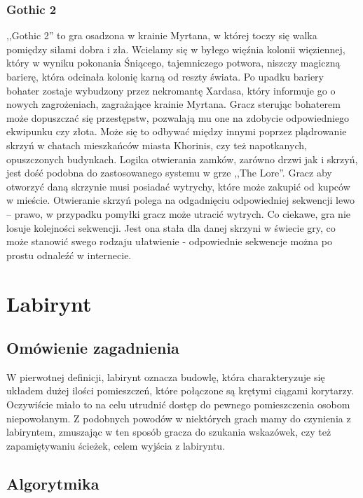\documentclass[oneside,polski,logo]{amuthesis}
\begin{document}
\subsubsection{Gothic 2}
\par ,,Gothic 2'' to gra osadzona w krainie Myrtana, w której toczy się walka pomiędzy siłami dobra i zła. Wcielamy się w byłego więźnia kolonii więziennej, który w wyniku pokonania Śniącego, tajemniczego potwora, niszczy magiczną barierę, która odcinała kolonię karną od reszty świata. Po upadku bariery bohater zostaje wybudzony przez nekromantę Xardasa, który informuje go o nowych zagrożeniach, zagrażające krainie Myrtana. Gracz sterując bohaterem może dopuszczać się przestępstw, pozwalają mu one na zdobycie odpowiedniego ekwipunku czy złota. Może się to odbywać między innymi poprzez plądrowanie skrzyń w chatach mieszkańców miasta Khorinis, czy też napotkanych, opuszczonych budynkach. 
Logika otwierania zamków, zarówno drzwi jak i skrzyń, jest dość podobna do zastosowanego systemu w grze ,,The Lore''. Gracz aby otworzyć daną skrzynie musi posiadać wytrychy, które może zakupić od kupców w mieście. Otwieranie skrzyń polega na odgadnięciu odpowiedniej sekwencji lewo – prawo, w przypadku pomyłki gracz może utracić wytrych. Co ciekawe, gra nie losuje kolejności sekwencji. Jest ona stała dla danej skrzyni w świecie gry, co może stanowić swego rodzaju ułatwienie - odpowiednie sekwencje można po prostu odnaleźć w internecie.


\section{Labirynt}
\subsection{Omówienie zagadnienia}
\par W pierwotnej definicji, labirynt oznacza budowlę, która charakteryzuje się układem dużej ilości pomieszczeń, które połączone są krętymi ciągami korytarzy. Oczywiście miało to na celu utrudnić dostęp do pewnego pomieszczenia osobom niepowołanym. Z podobnych powodów w niektórych grach mamy do czynienia z labiryntem, zmuszając w ten sposób gracza do szukania wskazówek, czy też zapamiętywaniu ścieżek, celem wyjścia z labiryntu. 
\subsection{Algorytmika}
\end{document}
